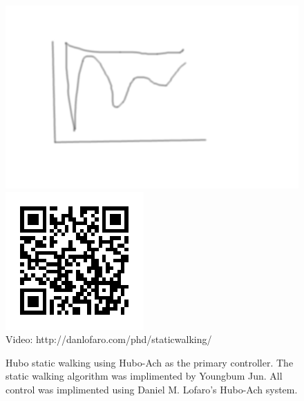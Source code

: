 \begin{figure}[thpb]
  \centering
      \includegraphics[width=0.93\columnwidth]{./pix/tmp.png}
      \includegraphics{./qrcode/qrcode-staticwalking.png}\\
      Video: http://danlofaro.com/phd/staticwalking/
\caption{Hubo static walking using Hubo-Ach as the primary controller.  The static walking algorithm was implimented by Youngbum Jun.  All control was
implimented using Daniel M. Lofaro's Hubo-Ach system.
}
  \label{fig:staticwalking}
\end{figure}
